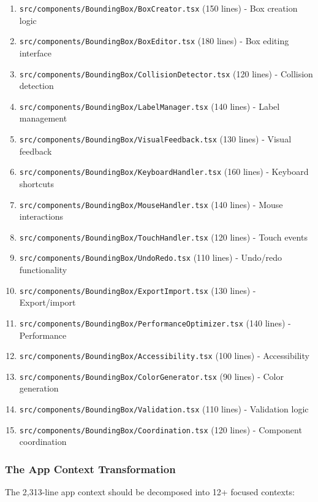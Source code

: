 \documentclass[11pt]{article}
\begin{document}
\begin{enumerate}
\item \texttt{src/components/BoundingBox/BoxCreator.tsx} (150 lines) - Box creation logic
\item \texttt{src/components/BoundingBox/BoxEditor.tsx} (180 lines) - Box editing interface
\item \texttt{src/components/BoundingBox/CollisionDetector.tsx} (120 lines) - Collision detection
\item \texttt{src/components/BoundingBox/LabelManager.tsx} (140 lines) - Label management
\item \texttt{src/components/BoundingBox/VisualFeedback.tsx} (130 lines) - Visual feedback
\item \texttt{src/components/BoundingBox/KeyboardHandler.tsx} (160 lines) - Keyboard shortcuts
\item \texttt{src/components/BoundingBox/MouseHandler.tsx} (140 lines) - Mouse interactions
\item \texttt{src/components/BoundingBox/TouchHandler.tsx} (120 lines) - Touch events
\item \texttt{src/components/BoundingBox/UndoRedo.tsx} (110 lines) - Undo/redo functionality
\item \texttt{src/components/BoundingBox/ExportImport.tsx} (130 lines) - Export/import
\item \texttt{src/components/BoundingBox/PerformanceOptimizer.tsx} (140 lines) - Performance
\item \texttt{src/components/BoundingBox/Accessibility.tsx} (100 lines) - Accessibility
\item \texttt{src/components/BoundingBox/ColorGenerator.tsx} (90 lines) - Color generation
\item \texttt{src/components/BoundingBox/Validation.tsx} (110 lines) - Validation logic
\item \texttt{src/components/BoundingBox/Coordination.tsx} (120 lines) - Component coordination
\end{enumerate}

\subsubsection{The App Context Transformation}

The 2,313-line app context should be decomposed into 12+ focused contexts:
\end{document}
